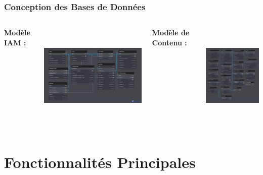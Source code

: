 \documentclass{beamer}
\begin{document}
\begin{frame}
\frametitle{Conception des Bases de Données}
\begin{columns}
\textbf{Modèle IAM :}
\begin{center}
    \includegraphics[width=\textwidth,height=5cm,keepaspectratio]{week_1_img/services_db_screanshots/Screenshot 2025-06-06 at 15-08-36 IAM_Service.pdf.png}
\end{center}

\textbf{Modèle de Contenu :}
\begin{center}
    \includegraphics[width=\textwidth,height=5cm,keepaspectratio]{week_1_img/services_db_screanshots/Screenshot 2025-06-06 at 15-07-51 Content_Service.pdf.png}
\end{center}
\end{columns}
\end{frame}

\section{Fonctionnalités Principales}
\end{document}

